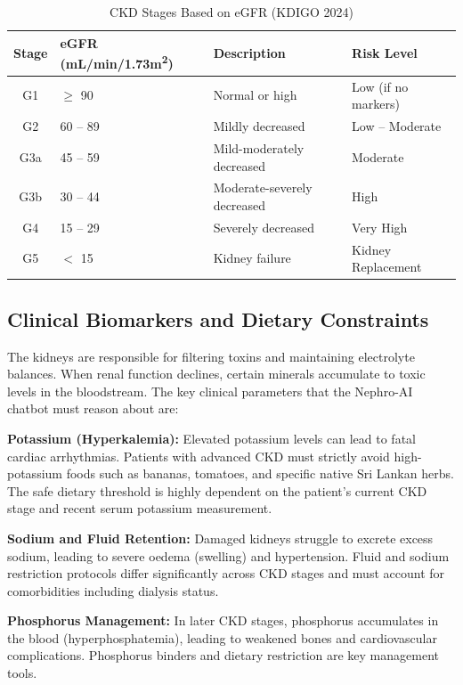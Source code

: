 \documentclass[12pt,a4paper]{report}
\begin{document}
\begin{table}[H]
\centering
\caption{CKD Stages Based on eGFR (KDIGO 2024)}
\label{tab:ckd_stages}
\renewcommand{\arraystretch}{1.3}
\begin{tabularx}{\textwidth}{@{}clXl@{}}
\toprule
\textbf{Stage} & \textbf{eGFR (mL/min/1.73m\textsuperscript{2})} & \textbf{Description} & \textbf{Risk Level} \\
\midrule
G1 & $\geq$ 90        & Normal or high         & Low (if no markers) \\
G2 & 60 -- 89         & Mildly decreased        & Low -- Moderate \\
G3a & 45 -- 59        & Mild-moderately decreased & Moderate \\
G3b & 30 -- 44        & Moderate-severely decreased & High \\
G4  & 15 -- 29        & Severely decreased      & Very High \\
G5  & $<$ 15          & Kidney failure          & Kidney Replacement \\
\bottomrule
\end{tabularx}
\end{table}

\subsection{Clinical Biomarkers and Dietary Constraints}

The kidneys are responsible for filtering toxins and maintaining electrolyte balances. When renal function declines, certain minerals accumulate to toxic levels in the bloodstream. The key clinical parameters that the Nephro-AI chatbot must reason about are:

\textbf{Potassium (Hyperkalemia):} Elevated potassium levels can lead to fatal cardiac arrhythmias. Patients with advanced CKD must strictly avoid high-potassium foods such as bananas, tomatoes, and specific native Sri Lankan herbs. The safe dietary threshold is highly dependent on the patient's current CKD stage and recent serum potassium measurement.

\textbf{Sodium and Fluid Retention:} Damaged kidneys struggle to excrete excess sodium, leading to severe oedema (swelling) and hypertension. Fluid and sodium restriction protocols differ significantly across CKD stages and must account for comorbidities including dialysis status.

\textbf{Phosphorus Management:} In later CKD stages, phosphorus accumulates in the blood (hyperphosphatemia), leading to weakened bones and cardiovascular complications. Phosphorus binders and dietary restriction are key management tools.
\end{document}
